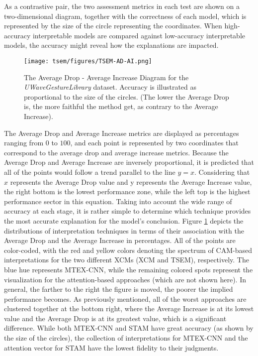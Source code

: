 \documentclass{svproc}
\begin{document}
As a contrastive pair, the two assessment metrics in each test are shown on a two-dimensional diagram, together with the correctness of each model, which is represented by the size of the circle representing the coordinates. When high-accuracy interpretable models are compared against low-accuracy interpretable models, the accuracy might reveal how the explanations are impacted.
\begin{figure}[h!]
\centering
\texttt{[image: tsem/figures/TSEM-AD-AI.png]}
\caption{The Average Drop - Average Increase Diagram for the \textit{UWaveGestureLibrary} dataset. Accuracy
is illustrated as proportional to the size of the circles. (The lower the Average Drop is, the more faithful
the method get, as contrary to the Average Increase).}
\label{fig:tsemadai}
\end{figure}
The Average Drop and Average Increase metrics are displayed as percentages ranging from $0$ to $100$, and each point is represented by two coordinates that correspond to the average drop and average increase metrics. Because the Average Drop and Average Increase are inversely proportional, it is predicted that all of the points would follow a trend parallel to the line $y = x$. Considering that $x$ represents the Average Drop value and y represents the Average Increase value, the right bottom is the lowest performance zone, while the left top is the highest performance sector in this equation. Taking into account the wide range of accuracy at each stage, it is rather simple to determine which technique provides the most accurate explanation for the model's conclusion. Figure \ref{fig:tsemadai} depicts the distributions of interpretation techniques in terms of their association with the Average Drop and the Average Increase in percentages. All of the points are color-coded, with the red and yellow colors denoting the spectrum of CAM-based interpretations for the two different XCMs (XCM and TSEM), respectively. The blue hue represents MTEX-CNN, while the remaining colored spots represent the visualization for the attention-based approaches (which are not shown here). In general, the farther to the right the figure is moved, the poorer the implied performance becomes. As previously mentioned, all of the worst approaches are clustered together at the bottom right, where the Average Increase is at its lowest value and the Average Drop is at its greatest value, which is a significant difference. While both MTEX-CNN and STAM have great accuracy (as shown by the size of the circles), the collection of interpretations for MTEX-CNN and the attention vector for STAM have the lowest fidelity to their judgments.
\end{document}
